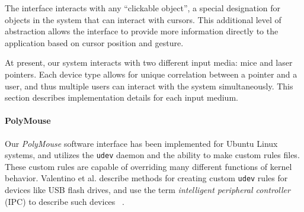 \documentclass[runningheads,a4paper]{llncs}
\begin{document}

The interface interacts with any ``clickable object'',
a special designation for objects in the system that can interact with cursors.
This additional level of abstraction allows the interface to
provide more information directly to the application based on cursor
position and gesture.  


At present, our system interacts with two different input media: mice and laser
pointers. Each device type allows for unique correlation between a pointer and a
user, and thus multiple users can interact with the system simultaneously.  
This section describes implementation details for each input medium.


\vspace{-0.1in}
\paragraph{\bf PolyMouse}

Our {\em PolyMouse} software interface has been implemented for
Ubuntu Linux systems, and utilizes the \verb+udev+ daemon
and the ability to make
custom rules files. These custom rules are capable of overriding many
different functions of kernel behavior. Valentino et al. describe methods
for creating custom \verb+udev+ rules for devices like USB flash drives, and use
the term {\em intelligent peripheral controller} (IPC) to describe such devices
~\cite{Valentino2010}.
\end{document}
